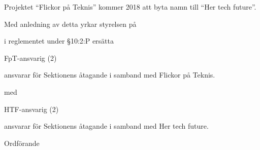 \documentclass[../_main/handlingar.tex]{subfiles}
\begin{document}
Projektet ``Flickor på Teknis'' kommer 2018 att byta namn till ``Her tech future''.

Med anledning av detta yrkar styrelsen på
\begin{attsatser}
    \att i reglementet under \S10:2:P ersätta\par
        FpT-ansvarig (2)
        \begin{tightdashlist}
            \item ansvarar för Sektionens åtagande i samband med Flickor på Teknis.
        \end{tightdashlist}
        med

          HTF-ansvarig (2)
          \begin{tightdashlist}
              \item ansvarar för Sektionens åtagande i samband med Her tech future.
          \end{tightdashlist}
\end{attsatser}

\begin{signatures}{1}
    \ist
    \signature{\ordf}{Ordförande}
\end{signatures}
\end{document}
